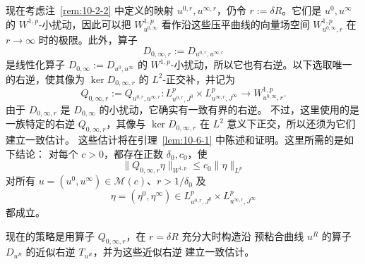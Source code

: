 现在考虑注~\ref{rem:10-2-2} 中定义的映射
$u^{0,r},u^{\infty,r}$，仍令 $r:=\delta R$。它们是
$u^0,u^\infty$ 的 $W^{1,p}$-小扰动，因此可以把
$W_{u^{0,\infty}}^{1,p}$ 看作沿这些压平曲线的向量场空间
$W_{u^{0,\infty},r}^{1,p}$ 在 $r\to\infty$ 时的极限。此外，算子
\[
  D_{0,\infty,r}:=D_{u^{0,r},u^{\infty,r}}
\]
是线性化算子 $D_{0,\infty}:=D_{u^0,u^\infty}$ 的
$W^{1,p}$-小扰动，所以它也有右逆。以下选取唯一的右逆，使其像为
$\ker D_{0,\infty,r}$ 的 $L^2$-正交补，并记为
\[
  Q_{0,\infty,r}:=Q_{u^{0,r},u^{\infty,r}}:
  L_{u^{0,r},J^0}^p\times L_{u^{\infty,r},J^\infty}^p
  \longrightarrow W_{u^{0,\infty},r}^{1,p}.
\]
由于 $D_{0,\infty,r}$ 是 $D_{0,\infty}$ 的小扰动，它确实有一致有界的右逆。
不过，这里使用的是一族特定的右逆 $Q_{0,\infty,r}$，其像与
$\ker D_{0,\infty,r}$ 在 $L^2$ 意义下正交，所以还须为它们建立一致估计。
这些估计将在引理~\ref{lem:10-6-1} 中陈述和证明。这里所需的是如下结论：
对每个 $c>0$，都存在正数 $\delta_0,c_0$，使
\begin{equation}\label{eq:10-5-2}
  \|Q_{0,\infty,r}\eta\|_{W^{1,p}}
  \le c_0\|\eta\|_{L^p}
\end{equation}
对所有 $u=(u^0,u^\infty)\in\mathcal M(c)$、$r>1/\delta_0$ 及
\[
  \eta=(\eta^0,\eta^\infty)
  \in L_{u^{0,r},J^0}^p\times L_{u^{\infty,r},J^\infty}^p
\]
都成立。

现在的策略是用算子 $Q_{0,\infty,r}$，在 $r=\delta R$ 充分大时构造沿
预粘合曲线 $u^R$ 的算子 $D_{u^R}$ 的近似右逆 $T_{u^R}$，并为这些近似右逆
建立一致估计。

